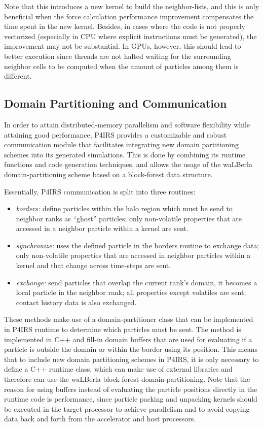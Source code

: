\documentclass[preprint,12pt]{elsarticle}
\begin{document}
Note that this introduces a new kernel to build the neighbor-lists, and this is only beneficial when the force calculation performance improvement compensates the time spent in the new kernel.
Besides, in cases where the code is not properly vectorized (especially in CPU where explicit instructions must be generated), the improvement may not be substantial.
In GPUs, however, this should lead to better execution since threads are not halted waiting for the surrounding neighbor cells to be computed when the amount of particles among them is different.

\subsection{Domain Partitioning and Communication}
\label{sec:domain_partitioning}

In order to attain distributed-memory parallelism and software flexibility while attaining good performance, P4IRS provides a customizable and robust communication module that facilitates integrating new domain partitioning schemes into its generated simulations.
This is done by combining its runtime functions and code generation techniques, and allows the usage of the waLBerla domain-partitioning scheme based on a block-forest data structure.

Essentially, P4IRS communication is split into three routines:

\begin{itemize}
    \item \emph{borders:} define particles within the halo region which must be send to neighbor ranks as ``ghost'' particles; only non-volatile properties that are accessed in a neighbor particle within a kernel are sent.
    \item \emph{synchronize:} uses the defined particle in the borders routine to exchange data; only non-volatile properties that are accessed in neighbor particles within a kernel and that change across time-steps are sent.
    \item \emph{exchange:} send particles that overlap the current rank's domain, it becomes a local particle in the neighbor rank; all properties except volatiles are sent; contact history data is also exchanged.
\end{itemize}

These methods make use of a domain-partitioner class that can be implemented in P4IRS runtime to determine which particles must be sent.
The method is implemented in C++ and fill-in domain buffers that are used for evaluating if a particle is outside the domain or within the border using its position.
This means that to include new domain partitioning schemes in P4IRS, it is only necessary to define a C++ runtime class, which can make use of external libraries and therefore can use the waLBerla block-forest domain-partitioning.
Note that the reason for using buffers instead of evaluating the particle positions directly in the runtime code is performance, since particle packing and unpacking kernels should be executed in the target processor to achieve parallelism and to avoid copying data back and forth from the accelerator and host processors.
\end{document}
